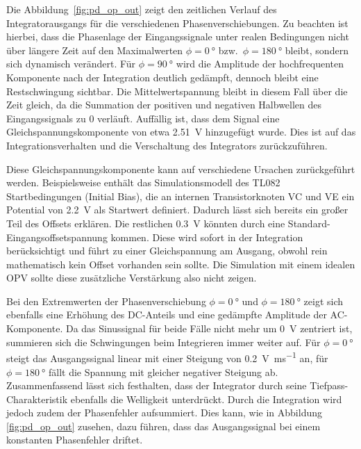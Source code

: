 \documentclass[../main.tex]{subfiles}
\begin{document}

Die Abbildung~\ref{fig:pd_op_out} zeigt den zeitlichen Verlauf des Integratorausgangs für die verschiedenen Phasenverschiebungen. Zu beachten ist hierbei, dass die Phasenlage der Eingangssignale unter realen Bedingungen nicht über längere Zeit auf den Maximalwerten $\phi = \SI{0}{\degree}$ bzw.~$\phi = \SI{180}{\degree}$  bleibt, sondern sich dynamisch verändert. Für $\phi = \SI{90}{\degree}$ wird die Amplitude der hochfrequenten Komponente nach der Integration deutlich gedämpft, dennoch bleibt eine Restschwingung sichtbar. Die Mittelwertspannung bleibt in diesem Fall über die Zeit gleich, da die Summation der positiven und negativen Halbwellen des Eingangssignals zu 0 verläuft. Auffällig ist, dass dem Signal eine Gleichspannungskomponente von etwa \SI{2.51}{\volt} hinzugefügt wurde. Dies ist auf das Integrationsverhalten und die Verschaltung des Integrators zurückzuführen.\par
\medskip
Diese Gleichspannungskomponente kann auf verschiedene Ursachen zurückgeführt werden. Beispielsweise enthält das Simulationsmodell des TL082 Startbedingungen (Initial Bias), die an internen Transistorknoten VC und VE ein Potential von \SI{2.2}{\volt} als Startwert definiert. Dadurch lässt sich bereits ein großer Teil des Offsets erklären. Die restlichen \SI{0.3}{\volt} könnten durch eine Standard-Eingangsoffsetspannung kommen. Diese wird sofort in der Integration berücksichtigt und führt zu einer Gleichspannung am Ausgang, obwohl rein mathematisch kein Offset vorhanden sein sollte. Die Simulation mit einem idealen OPV sollte diese zusätzliche Verstärkung also nicht zeigen.\par
\medskip
Bei den Extremwerten der Phasenverschiebung $\phi = \SI{0}{\degree}$ und  $\phi = \SI{180}{\degree}$ zeigt sich ebenfalls eine Erhöhung des DC-Anteils und eine gedämpfte Amplitude der AC-Komponente. Da das Sinussignal für beide Fälle nicht mehr um \SI{0}{\volt} zentriert ist, summieren sich die Schwingungen beim Integrieren immer weiter auf. Für  $\phi = \SI{0}{\degree}$ steigt das Ausgangssignal linear mit einer Steigung von \SI{0.2}{\volt\per\milli\second} an, für $\phi = \SI{180}{\degree}$ fällt die Spannung mit gleicher negativer Steigung ab. Zusammenfassend lässt sich festhalten, dass der Integrator durch seine Tiefpass-Charakteristik ebenfalls die Welligkeit unterdrückt. Durch die Integration wird jedoch zudem der Phasenfehler aufsummiert. Dies kann, wie in Abbildung \ref{fig:pd_op_out} zusehen, dazu führen, dass das Ausgangssignal bei einem konstanten Phasenfehler driftet. \par
\end{document}
